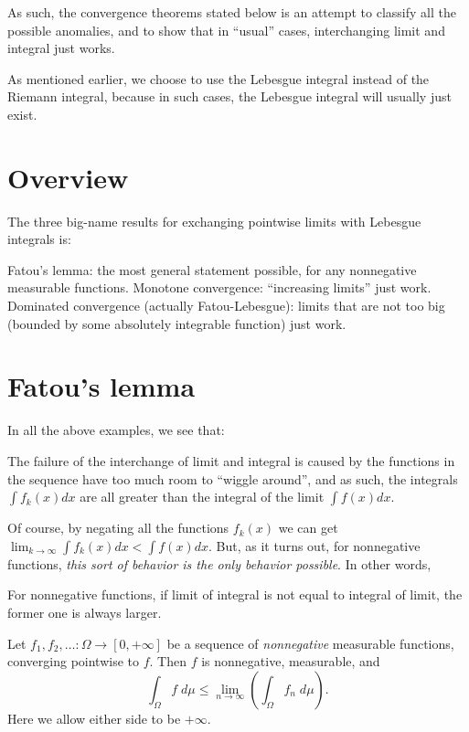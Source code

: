 As such, the convergence theorems stated below is an attempt to classify all the possible anomalies,
and to show that in ``usual'' cases, interchanging limit and integral just works.

As mentioned earlier, we choose to use the Lebesgue integral instead of the Riemann integral,
because in such cases, the Lebesgue integral will usually just exist.


\section{Overview}
The three big-name results for exchanging
pointwise limits with Lebesgue integrals is:
\begin{itemize}
	\ii Fatou's lemma: the most general statement possible,
	for any nonnegative measurable functions.
	\ii Monotone convergence: ``increasing limits'' just work.
	\ii Dominated convergence (actually Fatou-Lebesgue):
	limits that are not too big
	(bounded by some absolutely integrable function) just work.
\end{itemize}

\section{Fatou's lemma}

In all the above examples, we see that:
\begin{itemize}
	\ii The failure of the interchange of limit and integral is caused by
	the functions in the sequence have too much room to ``wiggle around'', and
	\ii as such, the integrals $\int f_k(x) dx$ are all greater than the integral of the limit $\int f(x)
	dx$.
\end{itemize}
Of course, by negating all the functions $f_k(x)$ we can get $\lim_{k \to \infty} \int f_k(x) dx < \int
f(x) dx$.
But, as it turns out, for nonnegative functions, \emph{this sort of behavior is the only behavior
possible}. In other words,
\begin{moral}
	For nonnegative functions, if limit of integral is not equal to integral of limit, the former one is
	always larger.
\end{moral}

\begin{lemma}
	Let $f_1, f_2, \dots \colon \Omega \to [0,+\infty]$
	be a sequence of \emph{nonnegative} measurable functions, converging pointwise to $f$.
	Then $f$ is nonnegative, measurable, and
	\[ \int_\Omega f \; d\mu
		\le \lim_{n \to \infty} \left( \int_\Omega f_n \; d\mu \right).  \]
	Here we allow either side to be $+\infty$.
\end{lemma}

